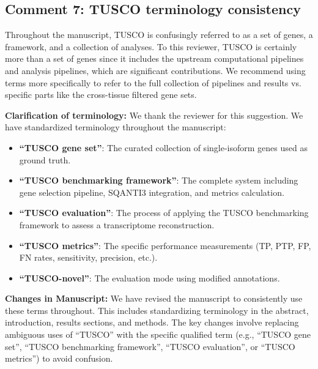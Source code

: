 \documentclass[11pt]{article}
\begin{document}
\subsection{Comment 7: TUSCO terminology consistency}

\begin{reviewercomment}
Throughout the manuscript, TUSCO is confusingly referred to as a set of genes, a framework, and a collection of analyses. To this reviewer, TUSCO is certainly more than a set of genes since it includes the upstream computational pipelines and analysis pipelines, which are significant contributions. We recommend using terms more specifically to refer to the full collection of pipelines and results vs. specific parts like the cross-tissue filtered gene sets.
\end{reviewercomment}

\begin{responseboxnew}
\textbf{Clarification of terminology:} We thank the reviewer for this suggestion. We have standardized terminology throughout the manuscript:

\begin{itemize}
    \item \textbf{``TUSCO gene set''}: The curated collection of single-isoform genes used as ground truth.
    \item \textbf{``TUSCO benchmarking framework''}: The complete system including gene selection pipeline, SQANTI3 integration, and metrics calculation.
    \item \textbf{``TUSCO evaluation''}: The process of applying the TUSCO benchmarking framework to assess a transcriptome reconstruction.
    \item \textbf{``TUSCO metrics''}: The specific performance measurements (TP, PTP, FP, FN rates, sensitivity, precision, etc.).
    \item \textbf{``TUSCO-novel''}: The evaluation mode using modified annotations.
\end{itemize}

\vspace{0.3cm}
\textbf{Changes in Manuscript:} We have revised the manuscript to consistently use these terms throughout. This includes standardizing terminology in the abstract, introduction, results sections, and methods. The key changes involve replacing ambiguous uses of ``TUSCO'' with the specific qualified term (e.g., ``TUSCO gene set'', ``TUSCO benchmarking framework'', ``TUSCO evaluation'', or ``TUSCO metrics'') to avoid confusion.
\end{responseboxnew}
\end{document}
